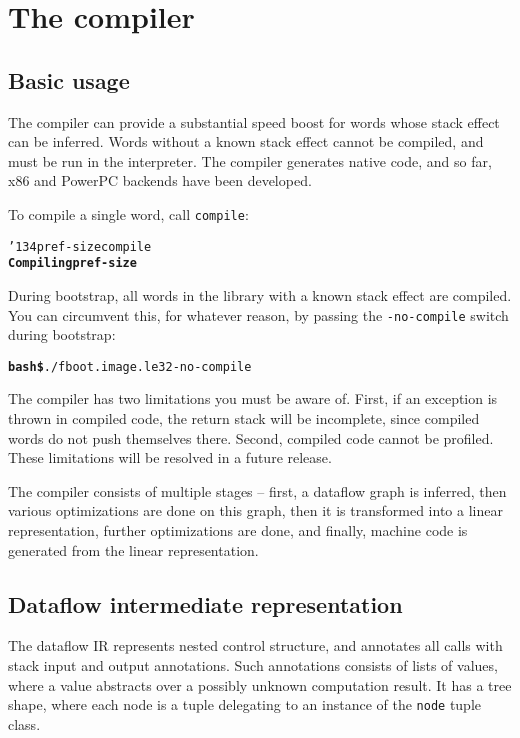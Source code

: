 \documentclass{book}
\newcommand{\bs}{\char'134}
\begin{document}
\chapter{The compiler}\label{compiler}

\section{Basic usage}

The compiler can provide a substantial speed boost for words whose stack effect can be inferred. Words without a known stack effect cannot be compiled, and must be run in the interpreter. The compiler generates native code, and so far, x86 and PowerPC backends have been developed.

To compile a single word, call \texttt{compile}:

\begin{alltt}
  \bs pref-size compile
\textbf{Compiling pref-size}
\end{alltt}

During bootstrap, all words in the library with a known stack effect are compiled. You can
circumvent this, for whatever reason, by passing the \texttt{-no-compile} switch during
bootstrap:

\begin{alltt}
\textbf{bash\$} ./f boot.image.le32 -no-compile
\end{alltt}

The compiler has two limitations you must be aware of. First, if an exception is thrown in compiled code, the return stack will be incomplete, since compiled words do not push themselves there. Second, compiled code cannot be profiled. These limitations will be resolved in a future release.

The compiler consists of multiple stages -- first, a dataflow graph is inferred, then various optimizations are done on this graph, then it is transformed into a linear representation, further optimizations are done, and finally, machine code is generated from the linear representation.

\section{Dataflow intermediate representation}

The dataflow IR represents nested control structure, and annotates all calls with stack input and output annotations. Such annotations consists of lists of values, where a value abstracts over a possibly unknown computation result. It has a tree shape, where each node is a tuple delegating to an instance of the \verb|node| tuple class.
\end{document}
